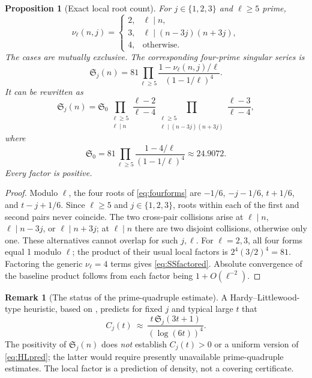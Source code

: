 \documentclass[11pt,a4paper]{article}
\newtheorem{proposition}[theorem]{Proposition}
\theoremstyle{definition}
\newtheorem{remark}[theorem]{Remark}
\newcommand{\SSer}{\mathfrak S}
\begin{document}
\begin{proposition}[Exact local root count]\label{prop:nu}
For $j\in\{1,2,3\}$ and $\ell\ge5$ prime,
\begin{equation}\label{eq:nu}
 \nu_\ell(n,j)=
 \begin{cases}
 2,&\ell\mid n,\\
 3,&\ell\mid(n-3j)(n+3j),\\
 4,&\text{otherwise}.
 \end{cases}
\end{equation}
The cases are mutually exclusive. The corresponding four-prime singular series is
\begin{equation}\label{eq:SS}
 \SSer_j(n)=81\prod_{\ell\ge5}
 \frac{1-\nu_\ell(n,j)/\ell}{(1-1/\ell)^4}.
\end{equation}
It can be rewritten as
\begin{equation}\label{eq:SSfactored}
 \boxed{\SSer_j(n)=\SSer_0
 \prod_{\substack{\ell\ge5\\\ell\mid n}}\frac{\ell-2}{\ell-4}
 \prod_{\substack{\ell\ge5\\\ell\mid(n-3j)(n+3j)}}\frac{\ell-3}{\ell-4}},
\end{equation}
where
\begin{equation}\label{eq:S0}
 \SSer_0=81\prod_{\ell\ge5}
 \frac{1-4/\ell}{(1-1/\ell)^4}\approx24.9072.
\end{equation}
Every factor is positive.
\end{proposition}
\begin{proof}
Modulo $\ell$, the four roots of \eqref{eq:fourforms} are
$-1/6$, $-j-1/6$, $t+1/6$, and $t-j+1/6$.
Since $\ell\ge5$ and $j\in\{1,2,3\}$, roots within each of the first and second pairs never coincide. The two cross-pair collisions arise at $\ell\mid n$, $\ell\mid n-3j$, or $\ell\mid n+3j$; at $\ell\mid n$ there are two disjoint collisions, otherwise only one. These alternatives cannot overlap for such $j,\ell$. For $\ell=2,3$, all four forms equal 1 modulo $\ell$; the product of their usual local factors is $2^4(3/2)^4=81$. Factoring the generic $\nu_\ell=4$ terms gives \eqref{eq:SSfactored}. Absolute convergence of the baseline product follows from each factor being $1+O(\ell^{-2})$.
\end{proof}

\begin{remark}[The status of the prime-quadruple estimate]
A Hardy--Littlewood-type heuristic, based on \cite{HardyLittlewood1923}, predicts for fixed $j$ and typical large $t$ that
\begin{equation}\label{eq:HLpred}
 C_j(t)\ \approx\ \frac{t\,\SSer_j(3t+1)}{(\log(6t))^4}.
\end{equation}
The positivity of $\SSer_j(n)$ does \emph{not} establish $C_j(t)>0$ or a uniform version of \eqref{eq:HLpred}; the latter would require presently unavailable prime-quadruple estimates. The local factor is a prediction of density, not a covering certificate.
\end{remark}
\end{document}
